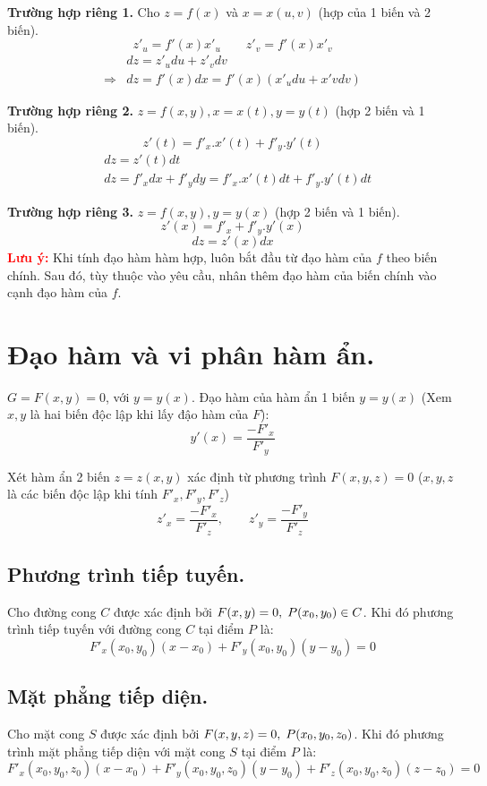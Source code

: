 \documentclass[12pt, a4paper]{report}
\begin{document}
\textbf{Trường hợp riêng 1.} Cho $z = f(x)$ và $x = x(u,v)$ (hợp của 1 biến và 2 biến).
\[
    z'_u = f'(x)x'_u \qquad z'_v = f'(x)x'_v    
\]
\[
    \begin{aligned}
        &dz = z'_u du + z'_v dv \\
        \Longrightarrow &dz = f'(x)dx = f'(x)(x'_u du + x'v dv)
    \end{aligned}    
\]

\textbf{Trường hợp riêng 2.} $z = f(x,y), x = x(t), y = y(t)$ (hợp 2 biến và 1 biến).
\[
    z'(t) = f'_x.x'(t) + f'_y.y'(t)   
\]
\[
    \begin{aligned}
        &dz = z'(t) dt \\
        &dz = f'_x dx + f'_y dy = f'_x.x'(t) dt + f'_y.y'(t) dt
    \end{aligned}
\]

\textbf{Trường hợp riêng 3.} $z=f(x,y), y= y(x)$ (hợp 2 biến và 1 biến).
\[
    z'(x) = f'_x + f'_y.y'(x)    
\]
\[
    dz = z'(x) dx    
\]
\textcolor{red}{\textbf{Lưu ý:}} Khi tính đạo hàm hàm hợp, luôn bắt đầu từ  đạo hàm của $f$ theo biến chính. Sau đó, tùy thuộc vào yêu cầu, nhân thêm đạo hàm của biến chính vào cạnh đạo hàm của $f$.
\section{Đạo hàm và vi phân hàm ẩn.}
$G = F(x,y) = 0$, với $y=y(x)$. Đạo hàm của hàm ẩn 1 biến $y=y(x)$ (Xem $x,y$ là hai biến độc lập khi lấy đậo hàm của $F$):
\[
    y'(x) = \frac{-F'_x}{F'_y}    
\]

Xét hàm ẩn 2 biến $z=z(x,y)$ xác định từ phương trình $F(x,y,z) = 0$ ($x,y,z$ là các biến độc lập khi tính $F'_x,F'_y,F'_z$)
\[
    z'_x = \frac{-F'_x}{F'_z}, \qquad z'_y = \frac{-F'_y}{F'_z}
\]
\subsection{Phương trình tiếp tuyến.}
Cho đường cong $C$ được xác định bởi $F(x,y) = 0,\thickspace P(x_0,y_0) \in C$. Khi đó phương trình tiếp tuyến với đường cong $C$ tại điểm $P$ là: 
\[
    F'_x(x_0,y_0)(x-x_0) + F'_y(x_0,y_0)(y-y_0) = 0
\]
\subsection{Mặt phẳng tiếp diện.}
Cho mặt cong $S$ được xác định bởi $F(x,y,z) = 0,\thickspace P(x_0,y_0,z_0)$. Khi đó phương trình mặt phẳng tiếp diện với mặt cong $S$ tại điểm $P$ là:
\[
    F'_x(x_0,y_0,z_0)(x-x_0) + F'_y(x_0,y_0,z_0)(y-y_0) + F'_z(x_0,y_0,z_0)(z-z_0) = 0
\]
\end{document}
